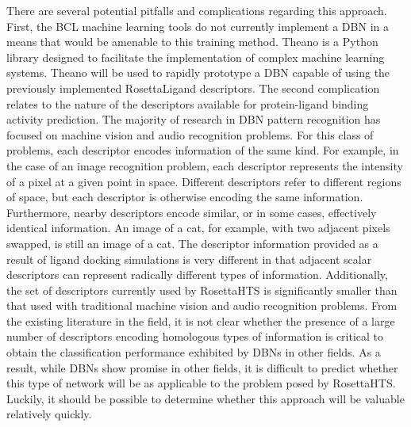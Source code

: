 There are several potential pitfalls and complications regarding this approach.
First, the \ac{BCL} machine learning tools do not currently implement a \ac{DBN} in a means that would be amenable to this training method.
Theano\citep{Bergstra:2010tc} is a Python library designed to facilitate the implementation of complex machine learning systems.
Theano will be used to rapidly prototype a \ac{DBN} capable of using the previously implemented RosettaLigand descriptors.
The second complication relates to the nature of the descriptors available for protein-ligand binding activity prediction.
The majority of research in \ac{DBN} pattern recognition has focused on machine vision and audio recognition problems.
For this class of problems, each descriptor encodes information of the same kind.
For example, in the case of an image recognition problem, each descriptor represents the intensity of a pixel at a given point in space.
Different descriptors refer to different regions of space, but each descriptor is otherwise encoding the same information.
Furthermore, nearby descriptors encode similar, or in some cases, effectively identical information.
An image of a cat, for example, with two adjacent pixels swapped, is still an image of a cat.
The descriptor information provided as a result of ligand docking simulations is very different in that adjacent scalar descriptors can represent radically different types of information.
Additionally, the set of descriptors currently used by RosettaHTS is significantly smaller than that used with traditional machine vision and audio recognition problems.
From the existing literature in the field, it is not clear whether the presence of a large number of descriptors encoding homologous types of information is critical to obtain the classification performance exhibited by \ac{DBN}s in other fields.
As a result, while \ac{DBN}s show promise in other fields, it is difficult to predict whether this type of network will be as applicable to the problem posed by RosettaHTS.
Luckily, it should be possible to determine whether this approach will be valuable relatively quickly.
